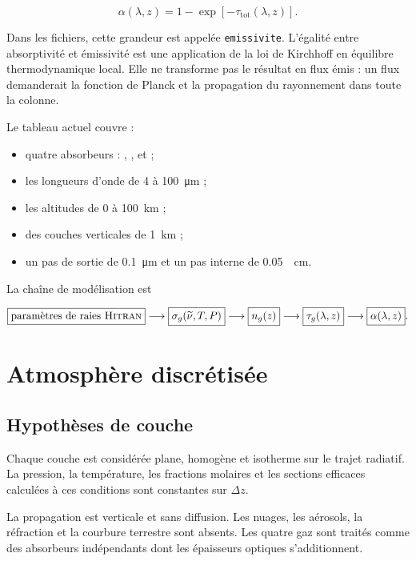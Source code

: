 \documentclass[11pt,a4paper]{article}
\newcommand{\HITRAN}{\textsc{Hitran}}
\newcommand{\code}[1]{\texttt{#1}}
\begin{document}
\begin{equation}
  \alpha(\lambda,z)=1-\exp[-\tau_{\mathrm{tot}}(\lambda,z)].
\end{equation}

Dans les fichiers, cette grandeur est appelée \code{emissivite}. L'égalité
entre absorptivité et émissivité est une application de la loi de Kirchhoff en
équilibre thermodynamique local. Elle ne transforme pas le résultat en flux
émis : un flux demanderait la fonction de Planck et la propagation du
rayonnement dans toute la colonne.

Le tableau actuel couvre :

\begin{itemize}[itemsep=2pt]
  \item quatre absorbeurs : , ,  et  ;
  \item les longueurs d'onde de 4 à \SI{100}{\micro\metre} ;
  \item les altitudes de 0 à \SI{100}{\kilo\metre} ;
  \item des couches verticales de \SI{1}{\kilo\metre} ;
  \item un pas de sortie de \SI{0.1}{\micro\metre} et un pas interne de
        \SI{0.05}{\per\centi\metre}.
\end{itemize}

La chaîne de modélisation est

\begin{equation*}
\boxed{\text{paramètres de raies \HITRAN}}
\longrightarrow
\boxed{\sigma_g(\widetilde\nu,T,P)}
\longrightarrow
\boxed{n_g(z)}
\longrightarrow
\boxed{\tau_g(\lambda,z)}
\longrightarrow
\boxed{\alpha(\lambda,z)}.
\end{equation*}

\section{Atmosphère discrétisée}

\subsection{Hypothèses de couche}

Chaque couche est considérée plane, homogène et isotherme sur le trajet
radiatif. La pression, la température, les fractions molaires et les sections
efficaces calculées à ces conditions sont constantes sur $\Delta z$.

La propagation est verticale et sans diffusion. Les nuages, les aérosols, la
réfraction et la courbure terrestre sont absents. Les quatre gaz sont traités
comme des absorbeurs indépendants dont les épaisseurs optiques s'additionnent.
\end{document}
